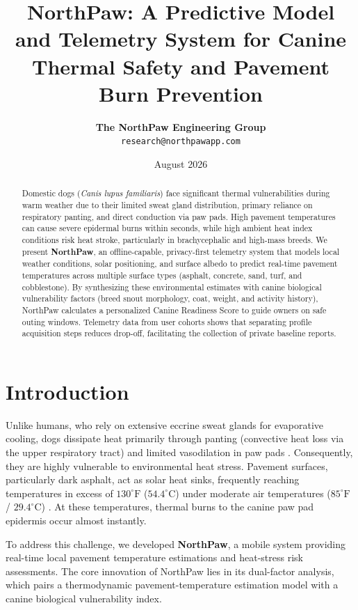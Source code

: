 \documentclass[11pt,twocolumn]{article}
\title{\textbf{NorthPaw: A Predictive Model and Telemetry System for Canine Thermal Safety and Pavement Burn Prevention}}
\author{
  \textbf{The NorthPaw Engineering Group} \\
  \texttt{research@northpawapp.com}
}
\date{August 2026}
\begin{document}
\maketitle

\begin{abstract}
Domestic dogs (\textit{Canis lupus familiaris}) face significant thermal vulnerabilities during warm weather due to their limited sweat gland distribution, primary reliance on respiratory panting, and direct conduction via paw pads. High pavement temperatures can cause severe epidermal burns within seconds, while high ambient heat index conditions risk heat stroke, particularly in brachycephalic and high-mass breeds. We present \textbf{NorthPaw}, an offline-capable, privacy-first telemetry system that models local weather conditions, solar positioning, and surface albedo to predict real-time pavement temperatures across multiple surface types (asphalt, concrete, sand, turf, and cobblestone). By synthesizing these environmental estimates with canine biological vulnerability factors (breed snout morphology, coat, weight, and activity history), NorthPaw calculates a personalized Canine Readiness Score to guide owners on safe outing windows. Telemetry data from user cohorts shows that separating profile acquisition steps reduces drop-off, facilitating the collection of private baseline reports.
\end{abstract}

\section{Introduction}
Unlike humans, who rely on extensive eccrine sweat glands for evaporative cooling, dogs dissipate heat primarily through panting (convective heat loss via the upper respiratory tract) and limited vasodilation in paw pads \cite{armstrong2016}. Consequently, they are highly vulnerable to environmental heat stress. Pavement surfaces, particularly dark asphalt, act as solar heat sinks, frequently reaching temperatures in excess of $130^\circ\text{F}$ ($54.4^\circ\text{C}$) under moderate air temperatures ($85^\circ\text{F}$ / $29.4^\circ\text{C}$) \cite{pavementheat2021}. At these temperatures, thermal burns to the canine paw pad epidermis occur almost instantly.

To address this challenge, we developed \textbf{NorthPaw}, a mobile system providing real-time local pavement temperature estimations and heat-stress risk assessments. The core innovation of NorthPaw lies in its dual-factor analysis, which pairs a thermodynamic pavement-temperature estimation model with a canine biological vulnerability index.
\end{document}
